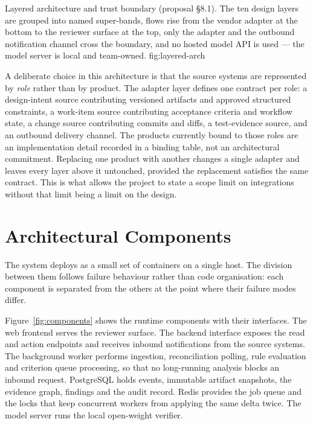 \lsfigure{}
  {Layered architecture and trust boundary (proposal §8.1). The ten
           design layers are grouped into named super-bands, flows rise from
           the vendor adapter at the bottom to the reviewer surface at the
           top, only the adapter and the outbound notification channel cross
           the boundary, and no hosted model API is used — the model server
           is local and team-owned.}
  {fig:layered-arch}

A deliberate choice in this architecture is that the source systems are
represented by \emph{role} rather than by product. The adapter layer defines one
contract per role: a design-intent source contributing versioned artifacts and
approved structured constraints, a work-item source contributing acceptance
criteria and workflow state, a change source contributing commits and diffs, a
test-evidence source, and an outbound delivery channel. The products currently
bound to those roles are an implementation detail recorded in a binding table,
not an architectural commitment. Replacing one product with another changes a
single adapter and leaves every layer above it untouched, provided the
replacement satisfies the same contract. This is what allows the project to
state a scope limit on integrations without that limit being a limit on the
design.

\section{Architectural Components}

The system deploys as a small set of containers on a single host. The division
between them follows failure behaviour rather than code organisation: each
component is separated from the others at the point where their failure modes
differ.

Figure~\ref{fig:components} shows the runtime components with their interfaces.
The web frontend serves the reviewer surface. The backend interface exposes the
read and action endpoints and receives inbound notifications from the source
systems. The background worker performs ingestion, reconciliation polling, rule
evaluation and criterion queue processing, so that no long-running analysis
blocks an inbound request. PostgreSQL holds events, immutable artifact
snapshots, the evidence graph, findings and the audit record. Redis provides the
job queue and the locks that keep concurrent workers from applying the same
delta twice. The model server runs the local open-weight verifier.

